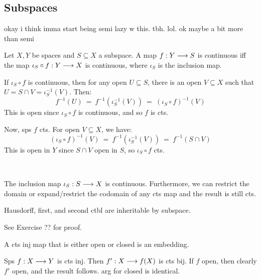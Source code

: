 \subsection{Subspaces}
okay i think imma start being semi lazy w this. tbh. lol. ok maybe a bit more
than semi

\begin{prop}[type=Theorem,title=Characteristic Property of the Subspace Topology]
    Let $ X, Y $ be spaces and $ S \subseteq X $ a subspace. A map $ f:Y \longrightarrow S $
    is continuous iff the map $ \iota_{S}\circ f:Y\longrightarrow X $ is continuous, where
    $ \iota_{S} $ is the inclusion map.
\end{prop}

\begin{pf}[source=Primary Source Material]
    If $ \iota_{S}\circ f $ is continuous, then for any open $ U \subseteq S $,
    there is an open $ V \subseteq X $ such that $ U = S \cap V =
    \iota_{S}^{-1}(V) $. Then:
    \begin{equation*}
        f^{-1}(U) \ = \ f^{-1}(\iota_{S}^{-1}(V)) \ = \
        (\iota_{S}\circ f)^{-1}(V)
    \end{equation*}
    This is open since $ \iota_{S}\circ f $ is continuous, and so $ f $ is cts.

    Now, sps $ f $ cts. For open $ V \subseteq X $, we have:
    \begin{equation*}
        (\iota_{S}\circ f)^{-1}(V) \ = \ f^{-1}(\iota_{S}^{-1}(V)) \ = \
        f^{-1}(S \cap V)
    \end{equation*}
    This is open in $ Y $ since $ S \cap V $ open in $ S $, so
    $ \iota_{S}\circ f $ cts.
\end{pf} \

\begin{crll}
    The inclusion map $ \iota_{S}:S \longrightarrow X $ is continuous. Furthermore, we can
    restrict the domain or expand/restrict the codomain of any cts map and the
    result is still cts.
\end{crll}

\begin{prop}
    Hausdorff, first, and second ctbl are inheritable by subspace.
\end{prop}
See Exercise ?? for proof.

\begin{prop}
    A cts inj map that is either open or closed is an embedding.
\end{prop}

\begin{pf}[source=Primary Source Material]
    Sps $ f:X \longrightarrow Y $ is cts inj. Then $ f':X \longrightarrow f(X) $ is cts bij. If $ f $
    open, then clearly $ f' $ open, and the result follows. arg for closed is
    identical.
\end{pf} \

